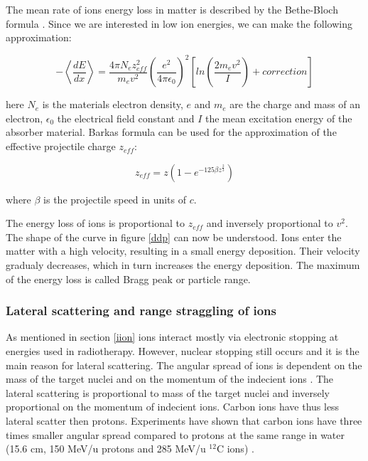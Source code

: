 \documentclass[type=dr, dr=rernat, accentcolor=tud7b,colorbacktitle, bigchapter, openright, twoside, 12pt ]{tudthesis}
\begin{document}
The mean rate of ions energy loss in matter is described by the Bethe-Bloch formula \cite{Bethe1930, Bloch1933}. Since we are interested in low ion energies, we can make the following approximation:

\begin{equation}
- \left \langle \frac{dE}{dx} \right \rangle = \frac{ 4 \pi N_{e} z_{eff}^{2} }{ m_{e} v^{2} } \left( \frac{e^{2}}{4\pi \epsilon_{0}} \right) ^{2} \left[ln \left( \frac{2m_{e}v^{2}}{I} \right)+correction \right]
 \label{bethe}
\end{equation}

here $N_{e}$ is the materials electron density, $e$ and $m_{e}$ are the charge and mass 
of an electron, $\epsilon_{0}$ the electrical field constant and $I$ the mean excitation energy of the absorber material. 
Barkas formula \cite{Barkas1963} can be used for the approximation of the effective projectile charge $z_{eff}$: 

\begin{equation}
 z_{eff} = z \left( 1 - e^{-125 \beta z^{\frac{2}{3}}} \right)
\end{equation}

where $\beta$ is the projectile speed in units of $c$.

The energy loss of ions is proportional to $z_{eff}$ and inversely proportional to $v^2$. The shape of the curve in figure \ref{ddp} can now be understood. Ions enter the matter with a high velocity,
resulting in a small energy deposition. Their velocity gradualy decreases, which in turn increases the energy deposition. The maximum of the energy loss is called Bragg peak or particle range.

\subsubsection{Lateral scattering and range straggling of ions}
\label{scat}
As mentioned in section \ref{iion} ions interact mostly via electronic stopping at energies used in radiotherapy. However, nuclear stopping still occurs and it is the main reason for lateral scattering.
The angular spread of ions is dependent on the mass of the target nuclei and on the momentum of the indecient ions \cite{Moliere1948}. The lateral scattering is proportional to mass of the target nuclei and inversely proportional
on the momentum of indecient ions. Carbon ions have thus less lateral scatter then protons. Experiments have shown that carbon ions have three times smaller angular spread compared to protons at the same range in water 
(15.6 cm, 150 MeV/u protons and 285 MeV/u $^{12}$C ions) \cite{Schardt2010}.
\end{document}
